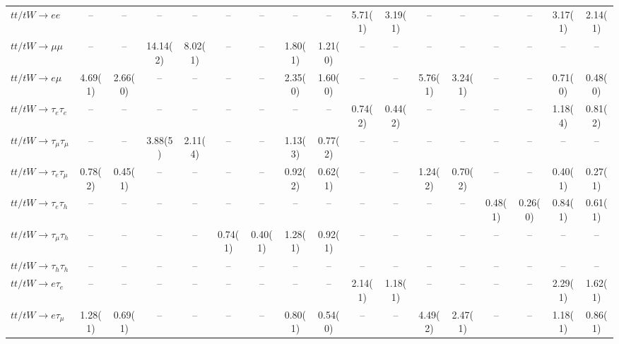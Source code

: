 \begin{sidewaystable}[p]
{\begin{tabular}{|l|cc|cc|cc|cc|cc|cc|cc|cc|}
    $tt/tW \to ee$                     &    --    &    --    &    --    &    --    &    --    &    --    &    --    &    --    &  5.71(1) &  3.19(1) &    --    &    --    &    --    &    --    &  3.17(1) &  2.14(1) \\ 
    $tt/tW \to \mu\mu$                 &    --    &    --    & 14.14(2) &  8.02(1) &    --    &    --    &  1.80(1) &  1.21(0) &    --    &    --    &    --    &    --    &    --    &    --    &    --    &    --    \\ 
    $tt/tW \to e\mu$                   &  4.69(1) &  2.66(0) &    --    &    --    &    --    &    --    &  2.35(0) &  1.60(0) &    --    &    --    &  5.76(1) &  3.24(1) &    --    &    --    &  0.71(0) &  0.48(0) \\ 
    $tt/tW \to \tau_{e}\tau_{e}$       &    --    &    --    &    --    &    --    &    --    &    --    &    --    &    --    &  0.74(2) &  0.44(2) &    --    &    --    &    --    &    --    &  1.18(4) &  0.81(2) \\ 
    $tt/tW \to \tau_{\mu}\tau_{\mu}$   &    --    &    --    &  3.88(5) &  2.11(4) &    --    &    --    &  1.13(3) &  0.77(2) &    --    &    --    &    --    &    --    &    --    &    --    &    --    &    --    \\ 
    $tt/tW \to \tau_{e}\tau_{\mu}$     &  0.78(2) &  0.45(1) &    --    &    --    &    --    &    --    &  0.92(2) &  0.62(1) &    --    &    --    &  1.24(2) &  0.70(2) &    --    &    --    &  0.40(1) &  0.27(1) \\ 
    $tt/tW \to \tau_{e}\tau_{h}$       &    --    &    --    &    --    &    --    &    --    &    --    &    --    &    --    &    --    &    --    &    --    &    --    &  0.48(1) &  0.26(0) &  0.84(1) &  0.61(1) \\ 
    $tt/tW \to \tau_{\mu}\tau_{h}$     &    --    &    --    &    --    &    --    &  0.74(1) &  0.40(1) &  1.28(1) &  0.92(1) &    --    &    --    &    --    &    --    &    --    &    --    &    --    &    --    \\ 
    $tt/tW \to \tau_{h}\tau_{h}$       &    --    &    --    &    --    &    --    &    --    &    --    &    --    &    --    &    --    &    --    &    --    &    --    &    --    &    --    &    --    &    --    \\ 
    $tt/tW \to e\tau_{e}$              &    --    &    --    &    --    &    --    &    --    &    --    &    --    &    --    &  2.14(1) &  1.18(1) &    --    &    --    &    --    &    --    &  2.29(1) &  1.62(1) \\ 
    $tt/tW \to e\tau_{\mu}$            &  1.28(1) &  0.69(1) &    --    &    --    &    --    &    --    &  0.80(1) &  0.54(0) &    --    &    --    &  4.49(2) &  2.47(1) &    --    &    --    &  1.18(1) &  0.86(1) \\ 

\end{tabular}}
\end{sidewaystable}
